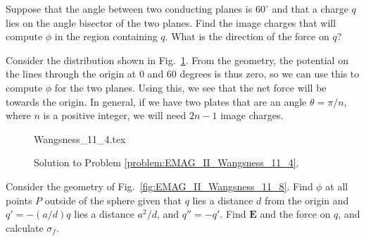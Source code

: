 \documentclass[crop=false,class=book,oneside]{standalone}
\begin{document}
            \begin{problem}
                \label{problem:EMAG_II_Wangsness_11_4}
                Suppose that the angle between two conducting planes
                is $60^{\circ}$ and that a charge $q$ lies on the
                angle bisector of the two planes. Find the image
                charges that will compute $\phi$ in the region
                containing $q$. What is the direction of the force
                on $q$?
            \end{problem}
            \begin{solution}
                Consider the distribution shown in
                Fig.~\ref{fig:EMAG_II_Wangsness_11_4}. From the
                geometry, the potential on the lines through the
                origin at $0$ and $60$ degrees is thus zero, so we
                can use this to compute $\phi$ for the two planes.
                Using this, we see that the net force will be
                towards the origin. In general, if we have two plates
                that are an angle $\theta=\pi/n$, where $n$ is a
                positive integer, we will need $2n-1$ image charges.
            \end{solution}
            \begin{figure}[H]
                \centering
                \captionsetup{type=figure}
                {Wangsness_11_4.tex}
                \caption{Solution to Problem
                         \ref{problem:EMAG_II_Wangsness_11_4}.}
                \label{fig:EMAG_II_Wangsness_11_4}
            \end{figure}
            \begin{problem}
                \label{problem:EMAG_II_Wangsness_11_8}
                Consider the geometry of
                Fig.~\ref{fig:EMAG_II_Wangsness_11_8}. Find
                $\phi$ at all points $P$ outside of the
                sphere given that $q$ lies a distance $d$ from the
                origin and $q'=\minus(a/d)q$ lies a distance
                $a^{2}/d$, and $q''=\minus{q}'$. Find
                $\mathbf{E}$ and the force on $q$, and
                calculate $\sigma_{f}$.
            \end{problem}
\end{document}
